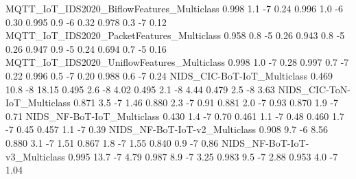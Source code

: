 MQTT_IoT_IDS2020_BiflowFeatures_Multiclass                            0.998                1.1           -7            0.24      0.996                   1.0              -6               0.30      0.995                   0.9              -6               0.32       0.978                    0.3               -7                0.12
MQTT_IoT_IDS2020_PacketFeatures_Multiclass                            0.958                0.8           -5            0.26      0.943                   0.8              -5               0.26      0.947                   0.9              -5               0.24       0.694                    0.7               -5                0.16
MQTT_IoT_IDS2020_UniflowFeatures_Multiclass                           0.998                1.0           -7            0.28      0.997                   0.7              -7               0.22      0.996                   0.5              -7               0.20       0.988                    0.6               -7                0.24
NIDS_CIC-BoT-IoT_Multiclass                                           0.469               10.8           -8           18.15      0.495                   2.6              -8               4.02      0.495                   2.1              -8               4.44       0.479                    2.5               -8                3.63
NIDS_CIC-ToN-IoT_Multiclass                                           0.871                3.5           -7            1.46      0.880                   2.3              -7               0.91      0.881                   2.0              -7               0.93       0.870                    1.9               -7                0.71
NIDS_NF-BoT-IoT_Multiclass                                            0.430                1.4           -7            0.70      0.461                   1.1              -7               0.48      0.460                   1.7              -7               0.45       0.457                    1.1               -7                0.39
NIDS_NF-BoT-IoT-v2_Multiclass                                         0.908                9.7           -6            8.56      0.880                   3.1              -7               1.51      0.867                   1.8              -7               1.55       0.840                    0.9               -7                0.86
NIDS_NF-BoT-IoT-v3_Multiclass                                         0.995               13.7           -7            4.79      0.987                   8.9              -7               3.25      0.983                   9.5              -7               2.88       0.953                    4.0               -7                1.04
